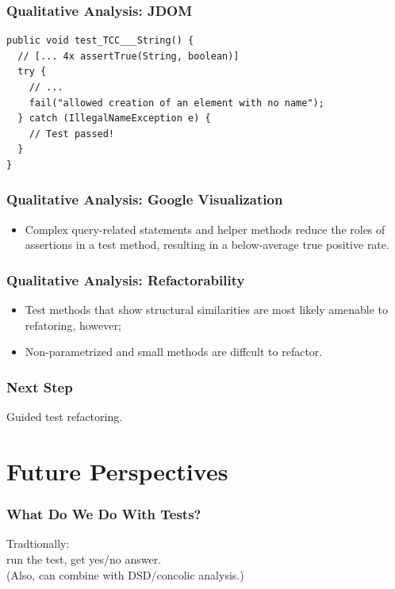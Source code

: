 \documentclass{beamer}
\newenvironment{changemargin}[1]{%
  \begin{list}{}{%
    \setlength{\topsep}{0pt}%
    \setlength{\leftmargin}{#1}%
    \setlength{\rightmargin}{1em}
    \setlength{\listparindent}{\parindent}%
    \setlength{\itemindent}{\parindent}%
    \setlength{\parsep}{\parskip}%
  }%
  \item[]}{\end{list}}
\begin{document}
\begin{frame}[fragile]
\frametitle{Qualitative Analysis: JDOM} {
\begin{lstlisting}
public void test_TCC___String() {
  // [... 4x assertTrue(String, boolean)]
  try {
    // ...
    fail("allowed creation of an element with no name");
  } catch (IllegalNameException e) { 
    // Test passed!
  }
}
\end{lstlisting}
}
\end{frame}

\begin{frame}
\frametitle{Qualitative Analysis: Google Visualization} {
   \Large
   \begin{itemize}
      \item Complex query-related statements and helper methods reduce
         the roles of assertions in a test method, 
         resulting in a below-average true positive rate.
   \end{itemize}    
}
\end{frame}

\begin{frame}
\frametitle{Qualitative Analysis: Refactorability} {
   \Large
   \begin{itemize}
      \item Test methods that show structural similarities are most likely amenable to
         refatoring, however;
         \vspace{0.5cm}
      \item Non-parametrized and small methods are diffcult to refactor.
   \end{itemize}    
}
\end{frame}

\begin{frame}
  \frametitle{Next Step}

\begin{center}
\Large
Guided test refactoring.
\end{center}
\end{frame}


\section{Future Perspectives}

\begin{frame}
  \frametitle{What Do We Do With Tests?}
\begin{changemargin}{1cm}
\Large
Tradtionally: \\
\hspace*{1em} run the test, get yes/no answer.\\[1em]

(Also, can combine with DSD/concolic analysis.)
\end{changemargin}
\end{frame}
\end{document}
